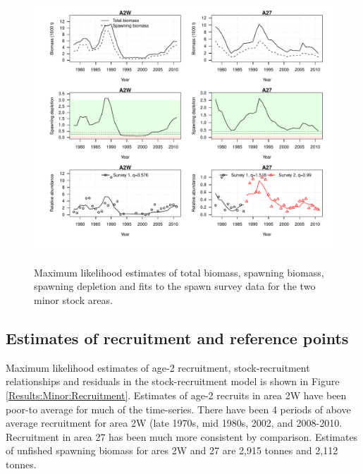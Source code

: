 \begin{figure}[!tbp]
	\includegraphics[width=\textwidth]{../FIGS/MinorAreas/iscam_fig_BiomassSpawnSurvey.pdf}\\
	\caption{Maximum likelihood estimates of total biomass, spawning biomass, spawning depletion and fits to the spawn survey data for the two minor stock areas.}\label{Results:Minor:figBiomass}
\end{figure}

\subsection{Estimates of recruitment and reference points}
Maximum likelihood estimates of age-2 recruitment, stock-recruitment relationships and residuals in the stock-recruitment model is shown in Figure \ref{Results:Minor:Recruitment}.  Estimates of age-2 recruits in area 2W have been poor-to average for much of the time-series.  There have been 4 periods of above average recruitment for area 2W (late 1970s, mid 1980s, 2002, and 2008-2010.  Recruitment in area 27 has been much more consistent by comparison.  Estimates of unfished spawning biomass for ares 2W and 27 are 2,915 tonnes and 2,112 tonnes.

